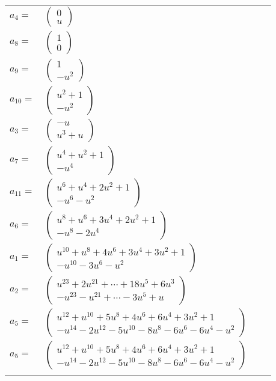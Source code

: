 \documentclass[1p]{elsarticle_modified}
\theoremstyle{definition}
\begin{document}
\begin{tabular}{m{7pt} m{180pt} m{7pt} m{180pt} }
\flushright $a_{4}=$&$\begin{pmatrix}0\\u\end{pmatrix}$ \\
\flushright $a_{8}=$&$\begin{pmatrix}1\\0\end{pmatrix}$ \\
\flushright $a_{9}=$&$\begin{pmatrix}1\\- u^2\end{pmatrix}$ \\
\flushright $a_{10}=$&$\begin{pmatrix}u^2+1\\- u^2\end{pmatrix}$ \\
\flushright $a_{3}=$&$\begin{pmatrix}- u\\u^3+u\end{pmatrix}$ \\
\flushright $a_{7}=$&$\begin{pmatrix}u^4+u^2+1\\- u^4\end{pmatrix}$ \\
\flushright $a_{11}=$&$\begin{pmatrix}u^6+u^4+2 u^2+1\\- u^6- u^2\end{pmatrix}$ \\
\flushright $a_{6}=$&$\begin{pmatrix}u^8+u^6+3 u^4+2 u^2+1\\- u^8-2 u^4\end{pmatrix}$ \\
\flushright $a_{1}=$&$\begin{pmatrix}u^{10}+u^8+4 u^6+3 u^4+3 u^2+1\\- u^{10}-3 u^6- u^2\end{pmatrix}$ \\
\flushright $a_{2}=$&$\begin{pmatrix}u^{23}+2 u^{21}+\cdots+18 u^5+6 u^3\\- u^{23}- u^{21}+\cdots-3 u^5+u\end{pmatrix}$ \\
\flushright $a_{5}=$&$\begin{pmatrix}u^{12}+u^{10}+5 u^8+4 u^6+6 u^4+3 u^2+1\\- u^{14}-2 u^{12}-5 u^{10}-8 u^8-6 u^6-6 u^4- u^2\end{pmatrix}$\\ \flushright $a_{5}=$&$\begin{pmatrix}u^{12}+u^{10}+5 u^8+4 u^6+6 u^4+3 u^2+1\\- u^{14}-2 u^{12}-5 u^{10}-8 u^8-6 u^6-6 u^4- u^2\end{pmatrix}$\\&\end{tabular}
\end{document}
